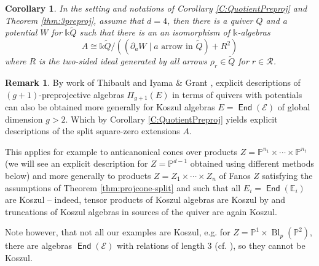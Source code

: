 \documentclass[a4paper,11pt, reqno]{amsart}
\def\E{\mathbb E}
\def\P{\mathbb P}
\def\sE{\mathscr{E}}
\def\Bl{{\operatorname{Bl}}}
\newcommand{\opname}[1]{\operatorname{\mathsf{#1}}}
\newcommand{\End}{\opname{End}}
\theoremstyle{plain}
\newtheorem{corollary}[dummy]{Corollary}
\theoremstyle{definition}
\newtheorem{remark}[dummy]{Remark}
\numberwithin{equation}{section}
\newlength{\arrow}
\begin{document}
\begin{corollary}\label{C:QuotientPreproj3}
    In the setting and notations of Corollary \ref{C:QuotientPreproj} and Theorem \ref{thm:3preproj}, assume that $d=4$, then there is a quiver $Q$ and a potential $W$ for $\mathbb{k}\widetilde{Q}$ such that there is an an isomorphism of $\mathbb{k}$-algebras \[A \cong \mathbb{k}\widetilde{Q}/((\partial_a W \mid a \text{ arrow in } \widetilde{Q}) + R^2)\]
    where $R$ is the two-sided ideal generated by all arrows $\rho_r \in \widetilde{Q}$ for $r \in \mathcal{R}$.
\end{corollary}

\begin{remark}\label{rmk:product-of-proj}
By work of Thibault \cite{Thibault} and Iyama \& Grant \cite{IG}, explicit descriptions of $(g+1)$-preprojective algebras $\Pi_{g+1}(E)$ in terms of quivers with potentials can also be obtained more generally for Koszul algebras $E=\End(\sE)$ of global dimension $g>2$. Which by Corollary \ref{C:QuotientPreproj} yields explicit descriptions of the split square-zero extensions $A$. 

This applies for example to anticanonical cones over products $Z=\P^{n_1} \times \cdots \times \P^{n_t}$ (we will see an explicit description for $Z=\P^{d-1}$ obtained using different methods below) and more generally to products $Z=Z_1 \times \cdots \times Z_n$ of Fanos $Z$ satisfying the assumptions of Theorem \ref{thm:projcone-split} and such that all $E_i=\End(\E_i)$ are Koszul -- indeed, tensor products of Koszul algebras are Koszul by \cite[Ex. 1.6]{MartinezVillaIntrotoKoszul} and truncations of Koszul algebras in sources of the quiver are again Koszul.


Note however, that not all our examples are Koszul, e.g. for $Z=\P^1 \times \Bl_p(\P^2)$, there are algebras $\End(\sE)$ with relations of length $3$ (cf. \cite{King}), so they cannot be Koszul.     \end{remark}
\end{document}
